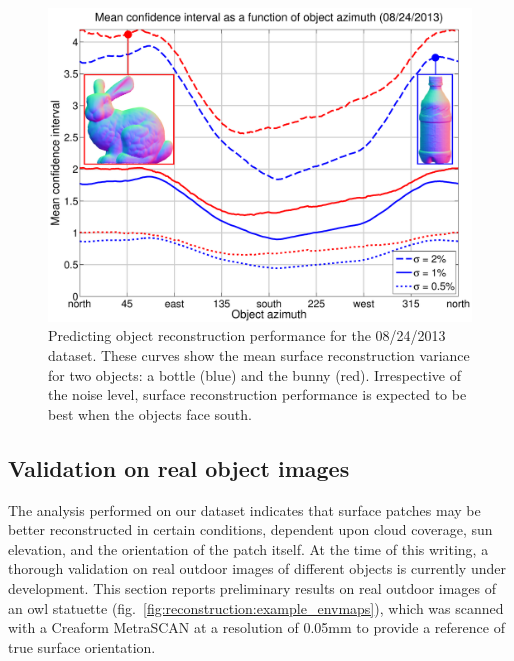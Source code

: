 \begin{figure}[t]
    \centering
    \includegraphics[width=\linewidth]{./figures/objectFig/objectFigNoise.pdf}
    \caption[Example of object reconstruction performance]{Predicting object reconstruction performance for the 08/24/2013 dataset. These curves show the mean surface reconstruction variance for two objects: a bottle (blue) and the bunny (red). Irrespective of the noise level, surface reconstruction performance is expected to be best when the objects face south.}
    \label{fig:objects}
\end{figure}

\subsection{Validation on real object images}
\label{sec:validation}

The analysis performed on our dataset indicates that surface patches may be better reconstructed in certain conditions, dependent upon cloud coverage, sun elevation, and the orientation of the patch itself. At the time of this writing, a thorough validation on real outdoor images of different objects is currently under development. This section reports preliminary results on real outdoor images of an owl statuette (fig.~\ref{fig:reconstruction:example_envmaps}), which was scanned with a Creaform MetraSCAN at a resolution of 0.05mm to provide a reference of true surface orientation.

